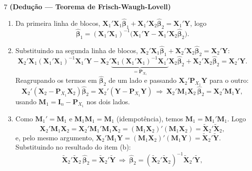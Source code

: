 \documentclass[11pt]{article}
\begin{document}
\begin{questao}{7} \textbf{(Dedução --- Teorema de Frisch-Waugh-Lovell)}
\end{questao}
\begin{solucao}
\begin{enumerate}[label=(\alph*)]
  \item Da primeira linha de blocos, $\mathbf{X}_1'\mathbf{X}_1\hat{\boldsymbol\beta}_1 +
    \mathbf{X}_1'\mathbf{X}_2\hat{\boldsymbol\beta}_2 = \mathbf{X}_1'\mathbf{Y}$, logo
    $$
    \hat{\boldsymbol\beta}_1 = (\mathbf{X}_1'\mathbf{X}_1)^{-1}\big(\mathbf{X}_1'\mathbf{Y} -
    \mathbf{X}_1'\mathbf{X}_2\hat{\boldsymbol\beta}_2\big).
    $$
  \item Substituindo na segunda linha de blocos, $\mathbf{X}_2'\mathbf{X}_1\hat{\boldsymbol\beta}_1
    + \mathbf{X}_2'\mathbf{X}_2\hat{\boldsymbol\beta}_2 = \mathbf{X}_2'\mathbf{Y}$:
    $$
    \mathbf{X}_2'\mathbf{X}_1(\mathbf{X}_1'\mathbf{X}_1)^{-1}\mathbf{X}_1'\mathbf{Y} -
    \mathbf{X}_2'\underbrace{\mathbf{X}_1(\mathbf{X}_1'\mathbf{X}_1)^{-1}\mathbf{X}_1'}_{=\mathbf{P}_{X_1}}\mathbf{X}_2\hat{\boldsymbol\beta}_2
    + \mathbf{X}_2'\mathbf{X}_2\hat{\boldsymbol\beta}_2 = \mathbf{X}_2'\mathbf{Y}.
    $$
    Reagrupando os termos em $\hat{\boldsymbol\beta}_2$ de um lado e passando
    $\mathbf{X}_2'\mathbf{P}_{X_1}\mathbf{Y}$ para o outro:
    $$
    \mathbf{X}_2'(\mathbf{X}_2 - \mathbf{P}_{X_1}\mathbf{X}_2)\hat{\boldsymbol\beta}_2 =
    \mathbf{X}_2'(\mathbf{Y} - \mathbf{P}_{X_1}\mathbf{Y})
    \ \Longrightarrow\
    \mathbf{X}_2'\mathbf{M}_1\mathbf{X}_2\,\hat{\boldsymbol\beta}_2 = \mathbf{X}_2'\mathbf{M}_1\mathbf{Y},
    $$
    usando $\mathbf{M}_1 = \mathbf{I}_n - \mathbf{P}_{X_1}$ nos dois lados.
  \item Como $\mathbf{M}_1' = \mathbf{M}_1$ e $\mathbf{M}_1\mathbf{M}_1 = \mathbf{M}_1$
    (idempotência), temos $\mathbf{M}_1 = \mathbf{M}_1'\mathbf{M}_1$. Logo
    $$
    \mathbf{X}_2'\mathbf{M}_1\mathbf{X}_2 = \mathbf{X}_2'\mathbf{M}_1'\mathbf{M}_1\mathbf{X}_2 =
    (\mathbf{M}_1\mathbf{X}_2)'(\mathbf{M}_1\mathbf{X}_2) = \tilde{\mathbf{X}}_2'\tilde{\mathbf{X}}_2,
    $$
    e, pelo mesmo argumento, $\mathbf{X}_2'\mathbf{M}_1\mathbf{Y} =
    (\mathbf{M}_1\mathbf{X}_2)'(\mathbf{M}_1\mathbf{Y}) = \tilde{\mathbf{X}}_2'\tilde{\mathbf{Y}}$.
    Substituindo no resultado do item (b):
    $$
    \tilde{\mathbf{X}}_2'\tilde{\mathbf{X}}_2\,\hat{\boldsymbol\beta}_2 =
    \tilde{\mathbf{X}}_2'\tilde{\mathbf{Y}}
    \ \Longrightarrow\
    \hat{\boldsymbol\beta}_2 = (\tilde{\mathbf{X}}_2'\tilde{\mathbf{X}}_2)^{-1}\tilde{\mathbf{X}}_2'\tilde{\mathbf{Y}},
$$
\end{enumerate}
\end{solucao}
\end{document}
